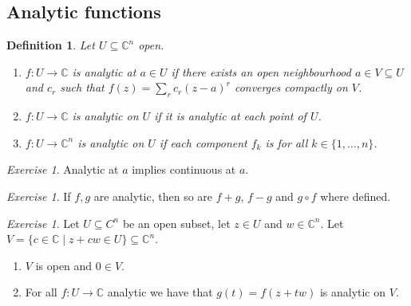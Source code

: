 \documentclass[12pt]{article}
\theoremstyle{darkgreentheorem}
\theoremstyle{darkbluedefinition}
\newtheorem{defn}[thm]{Definition}
\theoremstyle{darkredexample}
\theoremstyle{remark}
\newtheorem{exe}[thm]{Exercise}
\newcommand{\1}{\mathbbm{1}}
\newcommand{\C}{\mathbb{C}}
\begin{document}
\subsection{Analytic functions}

\begin{defn}
    Let $U\subseteq \C^{n}$ open.
    \begin{enumerate}[label=\roman*)]
	\item $f\colon U\to \C$ is \textit{analytic} at $a\in U$ if there exists an open neighbourhood $a\in V\subseteq U$ and $c_{r}$ such that $f(z)=\sum_{r}c_{r}(z-a)^{r}$ converges compactly on $V$.
	\item $f\colon U\to \C$ is \textit{analytic} on $U$ if it is analytic at each point of $U$.
	\item $f\colon U\to \C^{n}$ is \textit{analytic} on $U$ if each component $f_{k}$ is for all $k\in \{1,\ldots, n\}$.
    \end{enumerate}
\end{defn}

\begin{exe}
    Analytic at $a$ implies continuous at $a$.
\end{exe}

\begin{exe}
    If $f,g$ are analytic, then so are $f+g$, $f-g$ and $g\circ f$ where defined.
\end{exe}

\begin{exe}
    Let $U\subseteq C^{n}$ be an open subset, let $z\in U$ and $w\in \C^{n}$.
    Let $V=\{c\in \C\mid z+cw\in U\}\subseteq \C^{n}$.
    \begin{enumerate}[label=\roman*)]
	\item $V$ is open and $0\in V$.
	\item For all $f\colon U\to \C$ analytic we have that $g(t)=f(z+tw)$ is analytic on $V$.
    \end{enumerate}
\end{exe}
\end{document}
